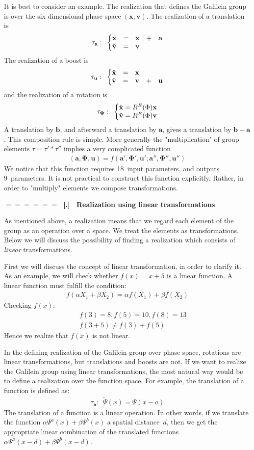 \documentclass[onecolumn,fleqn]{revtex4}
\newcommand{\amatrix}[1]{\begin{matrix} #1 \end{matrix}}
\newcommand{\beq}{\begin{eqnarray}}
\newcommand{\eeq}{\end{eqnarray}}
\renewcommand{\thesubsection}{\arabic{subsection}}
\renewcommand{\thesubsubsection}{\arabic{subsubsection}}
\newcommand{\sheadC}[1]
{
\addtocounter{subsubsection}{1}
\vspace{5mm}
{\Large\bf $=\!=\!=\!=\!=\!=\;$ [\thesubsection.\thesubsubsection] \ #1}  
\nopagebreak
\phantomsection
}
\begin{document}
It is best to consider an example. 
The realization that defines the Galilein group is over 
the six dimensional phase space ${(\mathbf{x},\mathbf{v})}$. 
The realization of a translation is 
\beq
\tau_{\mathbf{a}} : \,\,\, \left\{\amatrix{\tilde{\mathbf{x}}&=&\mathbf{x}&+&\mathbf{a}\cr 
\tilde{\mathbf{v}}&=&\mathbf{v}& & }\right. 
\eeq
The realization of a boost is 
\beq
\tau_{\mathbf{u}}: \,\,\, \left\{\amatrix{\tilde{\mathbf{x}}&=&\mathbf{x}& &\cr
\tilde{\mathbf{v}}&=&\mathbf{v}&+&\mathbf{u} }\right. 
\eeq
and the realization of a rotation is 
\beq
\tau_{\mathbf{\Phi}}:\,\,\, \left\{\amatrix{\tilde{\mathbf{x}}
=R^E(\Phi)\mathbf{x}\cr \tilde{\mathbf{v}}
= R^E(\Phi) \mathbf{v} }\right. 
\eeq
A translation by ${\mathbf{b}}$, 
and afterward a translation by ${\mathbf{a}}$, 
gives a translation by ${\mathbf{b}+\mathbf{a}}$. 
This composition rule is simple. 
More generally the "multiplication"  
of group elements ${\tau = \tau'*\tau''}$  
implies a very complicated function  
\beq
(\mathbf{a},\mathbf{\Phi},\mathbf{u}) 
= f(\mathbf{a}',\mathbf{\Phi}',\mathbf{u}' ; \mathbf{a}'',\mathbf{\Phi}'',\mathbf{u}'') 
\eeq
We notice that this function requires 18~input parameters, 
and outputs 9~parameters. It is not practical to construct this 
function explicitly. Rather, in order to "multiply" elements 
we compose transformations.   

\sheadC{Realization using linear transformations}

As mentioned above, a realization means that we regard  
each element of the group as an operation over a space. 
We treat the elements as transformations. Below 
we will discuss the possibility of finding a realization 
which consists of {\em linear} transformations. 

First we will discuss the concept of linear transformation, 
in order to clarify it. As an example, we will check 
whether ${f(x) = x + 5}$ is a linear function. 
A linear function must fulfill the condition:
\beq
f(\alpha X_1+\beta X_2)=\alpha f(X_1)+\beta f(X_2)
\eeq
Checking ${f(x)}$:
\beq
&& f(3) = 8 , f(5) = 10, f(8)=13
\\ \nonumber
&& f(3+5) \neq f(3) + f(5)
\eeq
Hence we realize that ${f(x)}$ is not linear. 

In the defining realization of the Galilein group 
over phase space, rotations are linear transformations, 
but translations and boosts are not. If we want to realize 
the Galilein group using linear transformations, the most natural 
way would be to define a realization over the function space. 
For example, the translation of a function is defined as:
\beq
\tau_{\mathbf{a}} : \,\,\, \tilde{\Psi}(x) = \Psi(x-a) 
\eeq
The translation of a function is a linear operation. 
In other words, if we translate the function ${\alpha\Psi^a(x)+\beta\Psi^b(x)}$ 
a spatial distance~$d$, then we get the appropriate linear combination 
of the translated functions ${\alpha\Psi^a(x-d)+\beta\Psi^b(x-d)}$.
\end{document}
